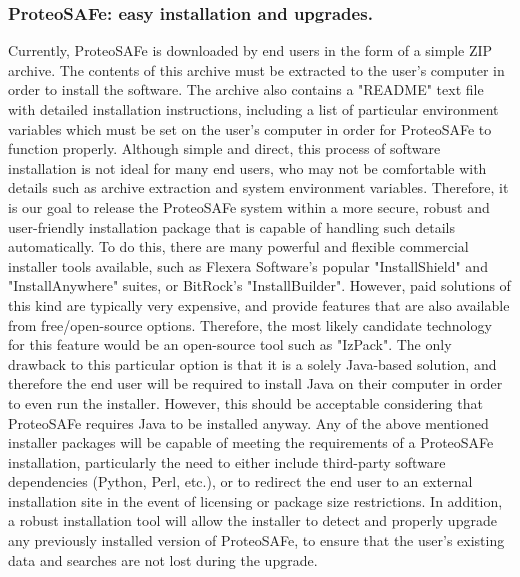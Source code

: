 \documentclass[arial,11pt]{article}
\begin{document}

\subsubsection{ProteoSAFe: easy installation and upgrades.}

Currently, ProteoSAFe is downloaded by end users in the form of a simple ZIP archive.  The contents of this archive must be extracted to the user's computer in order to install the software.  The archive also contains a "README" text file with detailed installation instructions, including a list of particular environment variables which must be set on the user's computer in order for ProteoSAFe to function properly.
%
Although simple and direct, this process of software installation is not ideal for many end users, who may not be comfortable with details such as archive extraction and system environment variables.  Therefore, it is our goal to release the ProteoSAFe system within a more secure, robust and user-friendly installation package that is capable of handling such details automatically.
%
To do this, there are many powerful and flexible commercial installer tools available, such as Flexera Software's popular "InstallShield" and "InstallAnywhere" suites, or BitRock's "InstallBuilder".  However, paid solutions of this kind are typically very expensive, and provide features that are also available from free/open-source options.  Therefore, the most likely candidate technology for this feature would be an open-source tool such as "IzPack".
%
The only drawback to this particular option is that it is a solely Java-based solution, and therefore the end user will be required to install Java on their computer in order to even run the installer.  However, this should be acceptable considering that ProteoSAFe requires Java to be installed anyway.
%
Any of the above mentioned installer packages will be capable of meeting the requirements of a ProteoSAFe installation, particularly the need to either include third-party software dependencies (Python, Perl, etc.), or to redirect the end user to an external installation site in the event of licensing or package size restrictions. In addition, a robust installation tool will allow the installer to detect and properly upgrade any previously installed version of ProteoSAFe, to ensure that the user's existing data and searches are not lost during the upgrade.
\end{document}
